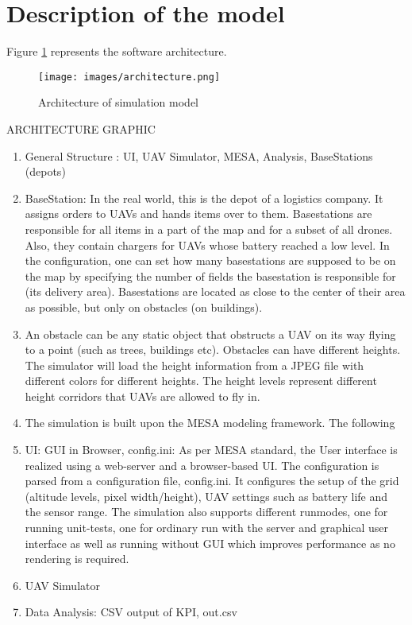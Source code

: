 \section{Description of the model}
Figure \ref{fig:architecture} represents the software architecture.
\begin{figure}[htbp]\label{fig:architecture}
	\texttt{[image: images/architecture.png]} 
	\caption{Architecture of simulation model}
\end{figure}
ARCHITECTURE GRAPHIC
\begin{enumerate}
	\item General Structure :  UI, UAV Simulator, MESA, Analysis, BaseStations (depots)
	\item BaseStation: In the real world, this is the depot of a logistics company. It assigns orders to UAVs and hands items over to them. Basestations are responsible for all items in a part of the map and for a subset of all drones. Also, they contain chargers for UAVs whose battery reached a low level. In the configuration, one can set how many basestations are supposed to be on the map by specifying the number of fields the basestation is responsible for (its delivery area). Basestations are located as close to the center of their area as possible, but only on obstacles (on buildings).
		\item An obstacle can be any static object that obstructs a UAV on its way flying to a point (such as trees, buildings etc). Obstacles can have different heights. The simulator will load the height information from a JPEG file with different colors for different heights. The height levels represent different height corridors that UAVs are allowed to fly in.
	\item The simulation is built upon the MESA modeling framework. The following 
	\item UI: GUI in Browser, config.ini: As per MESA standard, the User interface is realized using a web-server and a browser-based UI. The configuration is parsed from a configuration file,  config.ini. It configures the setup of the grid (altitude levels, pixel width/height), UAV settings such as battery life and the sensor range. The simulation also supports different runmodes, one for running unit-tests, one for ordinary run with the server and graphical user interface as well as running without GUI which improves performance as no rendering is required.
	\item UAV Simulator
	\item Data Analysis: CSV output of KPI, out.csv
\end{enumerate}

